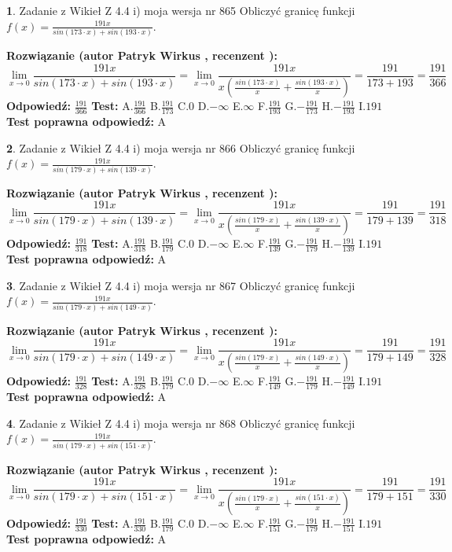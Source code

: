 \documentclass[12pt, a4paper]{article}
\theoremstyle{definition} %
\newtheorem{zad}{}
\newcommand{\zadStart}[1]{\begin{zad}#1\newline}
\newcommand{\zadStop}{\end{zad}}
\newcommand{\rozwStart}[2]{\noindent \textbf{Rozwiązanie (autor #1 , recenzent #2): }\newline}
\newcommand{\rozwStop}{\newline}
\newcommand{\odpStart}{\noindent \textbf{Odpowiedź:}\newline}
\newcommand{\odpStop}{\newline}
\newcommand{\testStart}{\noindent \textbf{Test:}\newline}
\newcommand{\testStop}{\newline}
\newcommand{\kluczStart}{\noindent \textbf{Test poprawna odpowiedź:}\newline}
\newcommand{\kluczStop}{\newline}
\begin{document}
\zadStart{Zadanie z Wikieł Z 4.4 i) moja wersja nr 865}
Obliczyć granicę funkcji $f(x)=\frac{191x}{sin(173\cdot x) +sin(193\cdot x)}$.
\zadStop
\rozwStart{Patryk Wirkus}{}
$$\lim\limits_{x\to 0}\frac{191x}{sin(173\cdot x) +sin(193\cdot x)}=\lim\limits_{x\to 0}\frac{191x}{x(\frac{sin(173\cdot x)}{x}+\frac{sin(193\cdot x)}{x})}=\frac{191}{173+193} = \frac{191}{366}$$
\rozwStop
\odpStart
$\frac{191}{366}$
\odpStop
\testStart
A.$\frac{191}{366}$
B.$\frac{191}{173}$
C.$0$
D.$-\infty$
E.$\infty$
F.$\frac{191}{193}$
G.$-\frac{191}{173}$
H.$-\frac{191}{193}$
I.$191$
\testStop
\kluczStart
A
\kluczStop



\zadStart{Zadanie z Wikieł Z 4.4 i) moja wersja nr 866}
Obliczyć granicę funkcji $f(x)=\frac{191x}{sin(179\cdot x) +sin(139\cdot x)}$.
\zadStop
\rozwStart{Patryk Wirkus}{}
$$\lim\limits_{x\to 0}\frac{191x}{sin(179\cdot x) +sin(139\cdot x)}=\lim\limits_{x\to 0}\frac{191x}{x(\frac{sin(179\cdot x)}{x}+\frac{sin(139\cdot x)}{x})}=\frac{191}{179+139} = \frac{191}{318}$$
\rozwStop
\odpStart
$\frac{191}{318}$
\odpStop
\testStart
A.$\frac{191}{318}$
B.$\frac{191}{179}$
C.$0$
D.$-\infty$
E.$\infty$
F.$\frac{191}{139}$
G.$-\frac{191}{179}$
H.$-\frac{191}{139}$
I.$191$
\testStop
\kluczStart
A
\kluczStop



\zadStart{Zadanie z Wikieł Z 4.4 i) moja wersja nr 867}
Obliczyć granicę funkcji $f(x)=\frac{191x}{sin(179\cdot x) +sin(149\cdot x)}$.
\zadStop
\rozwStart{Patryk Wirkus}{}
$$\lim\limits_{x\to 0}\frac{191x}{sin(179\cdot x) +sin(149\cdot x)}=\lim\limits_{x\to 0}\frac{191x}{x(\frac{sin(179\cdot x)}{x}+\frac{sin(149\cdot x)}{x})}=\frac{191}{179+149} = \frac{191}{328}$$
\rozwStop
\odpStart
$\frac{191}{328}$
\odpStop
\testStart
A.$\frac{191}{328}$
B.$\frac{191}{179}$
C.$0$
D.$-\infty$
E.$\infty$
F.$\frac{191}{149}$
G.$-\frac{191}{179}$
H.$-\frac{191}{149}$
I.$191$
\testStop
\kluczStart
A
\kluczStop



\zadStart{Zadanie z Wikieł Z 4.4 i) moja wersja nr 868}
Obliczyć granicę funkcji $f(x)=\frac{191x}{sin(179\cdot x) +sin(151\cdot x)}$.
\zadStop
\rozwStart{Patryk Wirkus}{}
$$\lim\limits_{x\to 0}\frac{191x}{sin(179\cdot x) +sin(151\cdot x)}=\lim\limits_{x\to 0}\frac{191x}{x(\frac{sin(179\cdot x)}{x}+\frac{sin(151\cdot x)}{x})}=\frac{191}{179+151} = \frac{191}{330}$$
\rozwStop
\odpStart
$\frac{191}{330}$
\odpStop
\testStart
A.$\frac{191}{330}$
B.$\frac{191}{179}$
C.$0$
D.$-\infty$
E.$\infty$
F.$\frac{191}{151}$
G.$-\frac{191}{179}$
H.$-\frac{191}{151}$
I.$191$
\testStop
\kluczStart
A
\kluczStop
\end{document}
